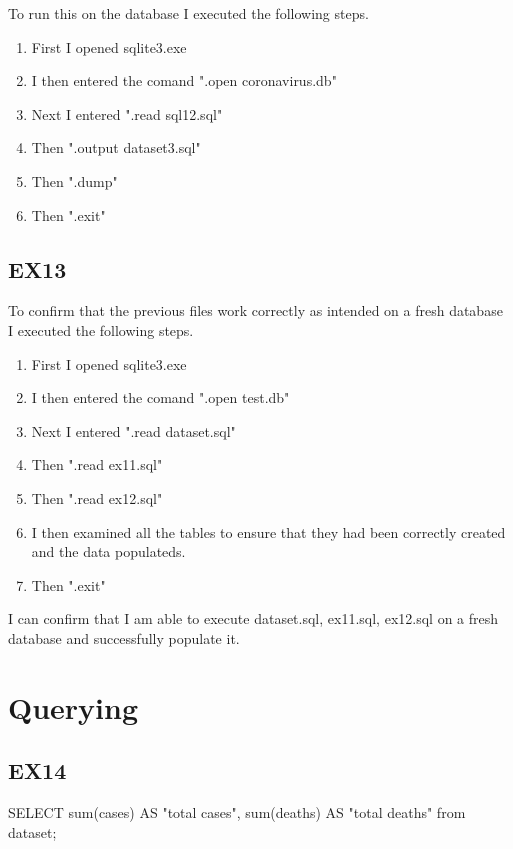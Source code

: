 \documentclass{report}
\begin{document}
	To run this on the database I executed the following steps.\newline
	
	\begin{enumerate}
		\item First I opened sqlite3.exe
		\item I then entered the comand ".open coronavirus.db"
		\item Next I entered ".read sql12.sql"
		\item Then ".output dataset3.sql"
		\item Then ".dump"
		\item Then ".exit"
	\end{enumerate}
	
	\subsection{EX13}
	
	To confirm that the previous files work correctly as intended on a fresh database I executed the following steps.\newline
	
	\begin{enumerate}
		\item First I opened sqlite3.exe
		\item I then entered the comand ".open test.db"
		\item Next I entered ".read dataset.sql"
		\item Then ".read ex11.sql"
		\item Then ".read ex12.sql"
		\item I then examined all the tables to ensure that they had been correctly created and the data populateds.
		\item Then ".exit"
	\end{enumerate}
	
	I can confirm that I am able to execute dataset.sql, ex11.sql, ex12.sql on a fresh database and successfully populate it.
	
	\section{Querying}
	
	
	\subsection{EX14}
	SELECT sum(cases) AS "total cases", sum(deaths) AS "total deaths" from dataset;\newline
	
\end{document}
